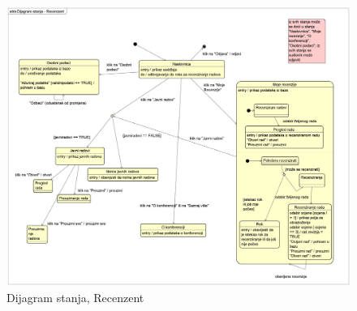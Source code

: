 			\begin{figure}[H]
				\includegraphics[width= 15 cm, height= 25 cm, keepaspectratio]{dijagrami/Dijagram stanja - Recenzent.png} 
				\centering
				\caption{Dijagram stanja, Recenzent}
				\label{fig:stanje2}
			\end{figure}
		
